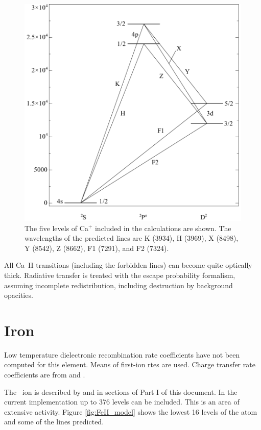 \begin{figure}
\centering
\includegraphics[scale=0.7]{CaIIEnergyLevels}
\caption[CaII model atom]{The five levels of Ca$^+$ included in the calculations are shown.
The wavelengths of the predicted lines are K (3934), H (3969), X (8498),
Y (8542), Z (8662), F1 (7291), and F2 (7324).}
\label{fig:CaIIEnergyLevels}
\end{figure}

All Ca~II transitions (including the forbidden lines) can become quite
optically thick.  Radiative transfer is treated with the escape probability
formalism, assuming incomplete redistribution, including destruction by
background opacities.

\section{Iron}

Low temperature dielectronic recombination rate coefficients have not
been computed for this element.  Means of first-ion rtes are used.  Charge transfer
rate coefficients are from \citet{Neufeld1989} and
\citet{Ferland1997}.

The \feii\ ion is described by \citet{Verner1999} and in sections of
Part I of this document.  In the current implementation up to 376 levels
can be included. This is an area of extensive activity.
Figure \ref{fig:FeII_model} shows
the lowest 16 levels of the atom and some of the lines predicted.

